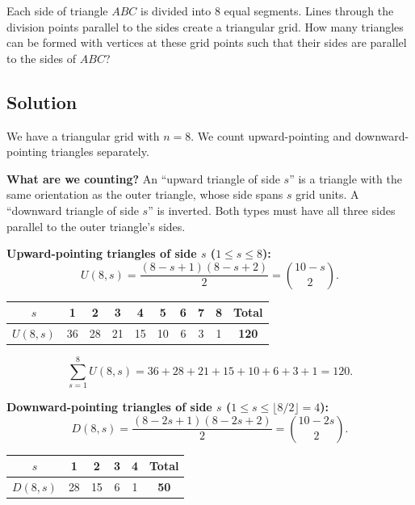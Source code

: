 \documentclass[12pt, a4paper]{article}
\begin{document}
\begin{problembox}
Each side of triangle $ABC$ is divided into $8$ equal segments.
Lines through the division points parallel to the sides create a triangular grid.
How many triangles can be formed with vertices at these grid points
such that their sides are parallel to the sides of $ABC$?
\end{problembox}

\subsection*{Solution}

We have a triangular grid with $n = 8$. We count upward-pointing and
downward-pointing triangles separately.

\textbf{What are we counting?}\; An ``upward triangle of side $s$'' is a triangle with the same orientation as the outer triangle, whose side spans $s$ grid units. A ``downward triangle of side $s$'' is inverted. Both types must have all three sides parallel to the outer triangle's sides.

\textbf{Upward-pointing triangles of side $s$\; ($1 \le s \le 8$):}
\[
  U(8,s) = \frac{(8-s+1)(8-s+2)}{2} = \binom{10-s}{2}.
\]

\begin{center}
\renewcommand{\arraystretch}{1.3}
\begin{tabular}{c|cccccccc|c}
\toprule
$s$ & 1 & 2 & 3 & 4 & 5 & 6 & 7 & 8 & Total \\
\midrule
$U(8,s)$ & 36 & 28 & 21 & 15 & 10 & 6 & 3 & 1 & \textbf{120} \\
\bottomrule
\end{tabular}
\end{center}

\[
  \sum_{s=1}^{8} U(8,s) = 36 + 28 + 21 + 15 + 10 + 6 + 3 + 1 = 120.
\]

\textbf{Downward-pointing triangles of side $s$\;
($1 \le s \le \lfloor 8/2 \rfloor = 4$):}
\[
  D(8,s) = \frac{(8-2s+1)(8-2s+2)}{2} = \binom{10-2s}{2}.
\]

\begin{center}
\renewcommand{\arraystretch}{1.3}
\begin{tabular}{c|cccc|c}
\toprule
$s$ & 1 & 2 & 3 & 4 & Total \\
\midrule
$D(8,s)$ & 28 & 15 & 6 & 1 & \textbf{50} \\
\bottomrule
\end{tabular}
\end{center}
\end{document}
